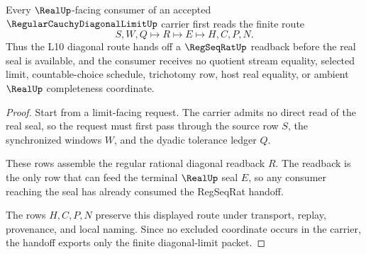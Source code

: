 \begin{theorem}
\label{thm:regular-cauchy-diagonal-limit-regseqrat-handoff}
Every $\RealUp$-facing consumer of an accepted $\RegularCauchyDiagonalLimitUp$ carrier first reads the finite route
$$
S,W,Q \longmapsto R \longmapsto E \longmapsto H,C,P,N .
$$
Thus the L10 diagonal route hands off a $\RegSeqRatUp$ readback before the real seal is available, and the consumer receives no quotient stream equality, selected limit, countable-choice schedule, trichotomy row, host real equality, or ambient $\RealUp$ completeness coordinate.
\end{theorem}
\begin{proof}
Start from a limit-facing request. The carrier admits no direct read of the real seal, so the request must first pass through the source row $S$, the synchronized windows $W$, and the dyadic tolerance ledger $Q$.

These rows assemble the regular rational diagonal readback $R$. The readback is the only row that can feed the terminal $\RealUp$ seal $E$, so any consumer reaching the seal has already consumed the RegSeqRat handoff.

The rows $H,C,P,N$ preserve this displayed route under transport, replay, provenance, and local naming. Since no excluded coordinate occurs in the carrier, the handoff exports only the finite diagonal-limit packet.
\end{proof}




